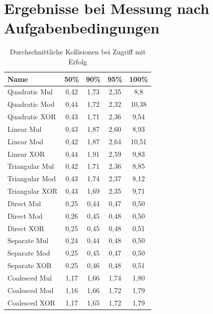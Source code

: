 \section{Ergebnisse bei Messung nach Aufgabenbedingungen}
\begin{table}[!ht]
\begin{tabular}{l|cccc}
    Name & 50\% & 90\% & 95\% & 100\% \\
    \hline
    Quadratic Mul & 0,42 & 1,73 & 2,35 & 8,8 \\
    Quadratic Mod & 0,44 & 1,72 & 2,32 & 10,38 \\
    Quadratic XOR & 0,43 & 1,71 & 2,36 & 9,54 \\
    \hline
    Linear Mul & 0,43 & 1,87 & 2,60 & 8,93 \\
    Linear Mod & 0,42 & 1,87 & 2,64 & 10,51 \\
    Linear XOR & 0,44 & 1,91 & 2,59 & 9,83 \\
    \hline
    Triangular Mul & 0,42 & 1,71 & 2,36 & 8,85 \\
    Triangular Mod & 0,43 & 1,74 & 2,37 & 8,12 \\
    Triangular XOR & 0,43 & 1,69 & 2,35 & 9,71 \\
    \hline
    Direct Mul & 0,25 & 0,44 & 0,47 & 0,50 \\
    Direct Mod & 0,26 & 0,45 & 0,48 & 0,50 \\
    Direct XOR & 0,25 & 0,45 & 0,48 & 0,51 \\
    \hline
    Separate Mul & 0,24 & 0,44 & 0,48 & 0,50 \\
    Separate Mod & 0,25 & 0,45 & 0,47 & 0,50 \\
    Separate XOR & 0,25 & 0,46 & 0,48 & 0,51 \\
    \hline
    Coalesced Mul & 1,17 & 1,66 & 1,74 & 1,80 \\
    Coalesced Mod & 1,16 & 1,66 & 1,72 & 1,79 \\
    Coalesced XOR & 1,17 & 1,65 & 1,72 & 1,79 \\
\end{tabular}
\centering
\caption{Durchschnittliche Kollisionen bei Zugriff mit Erfolg}
\end{table}
